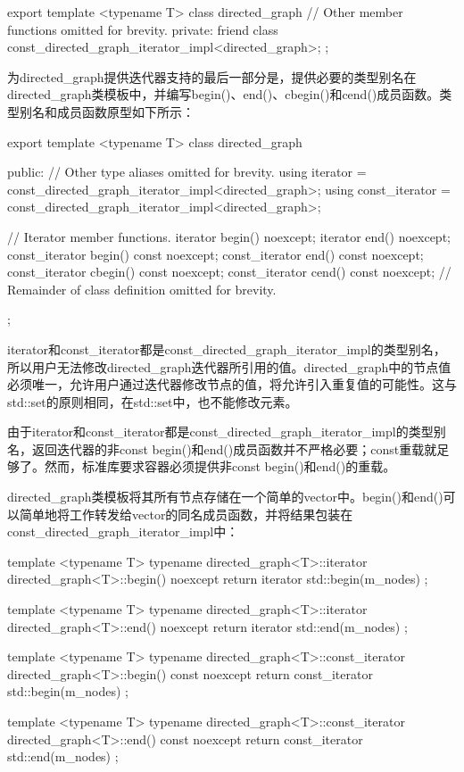\begin{cpp}
export template <typename T>
class directed_graph
{
    // Other member functions omitted for brevity.
    private:
        friend class const_directed_graph_iterator_impl<directed_graph>;
};
\end{cpp}


为directed\_graph提供迭代器支持的最后一部分是，提供必要的类型别名在directed\_graph类模板中，并编写begin()、end()、cbegin()和cend()成员函数。类型别名和成员函数原型如下所示：

\begin{cpp}
export template <typename T>
class directed_graph
{
    public:
        // Other type aliases omitted for brevity.
        using iterator = const_directed_graph_iterator_impl<directed_graph>;
        using const_iterator = const_directed_graph_iterator_impl<directed_graph>;

        // Iterator member functions.
        iterator begin() noexcept;
        iterator end() noexcept;
        const_iterator begin() const noexcept;
        const_iterator end() const noexcept;
        const_iterator cbegin() const noexcept;
        const_iterator cend() const noexcept;
        // Remainder of class definition omitted for brevity.
};
\end{cpp}

iterator和const\_iterator都是const\_directed\_graph\_iterator\_impl的类型别名，所以用户无法修改directed\_graph迭代器所引用的值。directed\_graph中的节点值必须唯一，允许用户通过迭代器修改节点的值，将允许引入重复值的可能性。这与std::set的原则相同，在std::set中，也不能修改元素。

由于iterator和const\_iterator都是const\_directed\_graph\_iterator\_impl的类型别名，返回迭代器的非const begin()和end()成员函数并不严格必要；const重载就足够了。然而，标准库要求容器必须提供非const begin()和end()的重载。

directed\_graph类模板将其所有节点存储在一个简单的vector中。begin()和end()可以简单地将工作转发给vector的同名成员函数，并将结果包装在const\_directed\_graph\_iterator\_impl中：

\begin{cpp}
template <typename T>
typename directed_graph<T>::iterator
    directed_graph<T>::begin() noexcept { return iterator{ std::begin(m_nodes) }; }

template <typename T>
typename directed_graph<T>::iterator
    directed_graph<T>::end() noexcept { return iterator { std::end(m_nodes) }; }

template <typename T>
typename directed_graph<T>::const_iterator
    directed_graph<T>::begin() const noexcept
{ return const_iterator { std::begin(m_nodes) }; }

template <typename T>
typename directed_graph<T>::const_iterator
    directed_graph<T>::end() const noexcept
{ return const_iterator { std::end(m_nodes) }; }
\end{cpp}


